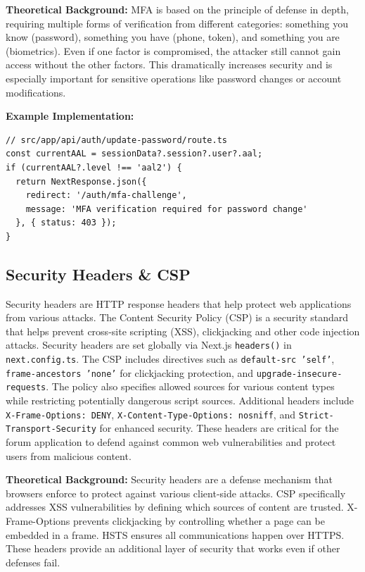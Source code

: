 \textbf{Theoretical Background:} MFA is based on the principle of defense in depth, requiring multiple forms of verification from different categories: something you know (password), something you have (phone, token), and something you are (biometrics). Even if one factor is compromised, the attacker still cannot gain access without the other factors. This dramatically increases security and is especially important for sensitive operations like password changes or account modifications.

\textbf{Example Implementation:}
\begin{verbatim}
// src/app/api/auth/update-password/route.ts
const currentAAL = sessionData?.session?.user?.aal;
if (currentAAL?.level !== 'aal2') {
  return NextResponse.json({
    redirect: '/auth/mfa-challenge',
    message: 'MFA verification required for password change'
  }, { status: 403 });
}
\end{verbatim}

\subsection{Security Headers \& CSP}

Security headers are HTTP response headers that help protect web applications from various attacks. The Content Security Policy (CSP) is a security standard that helps prevent cross-site scripting (XSS), clickjacking and other code injection attacks. Security headers are set globally via Next.js \texttt{headers()} in \texttt{next.config.ts}. The CSP includes directives such as \texttt{default-src 'self'}, \texttt{frame-ancestors 'none'} for clickjacking protection, and \texttt{upgrade-insecure-requests}. The policy also specifies allowed sources for various content types while restricting potentially dangerous script sources. Additional headers include \texttt{X-Frame-Options: DENY}, \texttt{X-Content-Type-Options: nosniff}, and \texttt{Strict-Transport-Security} for enhanced security. These headers are critical for the forum application to defend against common web vulnerabilities and protect users from malicious content.

\textbf{Theoretical Background:} Security headers are a defense mechanism that browsers enforce to protect against various client-side attacks. CSP specifically addresses XSS vulnerabilities by defining which sources of content are trusted. X-Frame-Options prevents clickjacking by controlling whether a page can be embedded in a frame. HSTS ensures all communications happen over HTTPS. These headers provide an additional layer of security that works even if other defenses fail.

